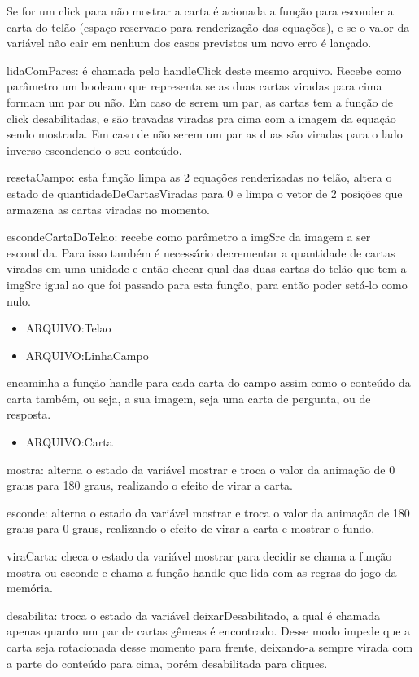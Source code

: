 Se for um click para não mostrar a carta é acionada a função para esconder a carta do telão (espaço reservado para renderização das equações), e se o valor da variável não cair em nenhum dos casos previstos um novo erro é lançado.

lidaComPares: é chamada pelo handleClick deste mesmo arquivo. Recebe como parâmetro um booleano que representa se as duas cartas viradas para cima formam um par ou não. Em caso de serem um par, as cartas tem a função de click desabilitadas, e são travadas viradas pra cima com a imagem da equação sendo mostrada. Em caso de não serem um par as duas são viradas para o lado inverso escondendo o seu conteúdo. 

resetaCampo: esta função limpa as 2 equações renderizadas no telão, altera o estado de quantidadeDeCartasViradas para 0 e limpa o vetor de 2 posições que armazena as cartas viradas no momento.

escondeCartaDoTelao: recebe como parâmetro a imgSrc da imagem a ser escondida. Para isso também é necessário decrementar a quantidade de cartas viradas em uma unidade e então checar qual das duas cartas do telão que tem a imgSrc igual ao que foi passado para esta função, para então poder setá-lo como nulo. 

\begin{itemize}
\item ARQUIVO:Telao
\end{itemize}	


\begin{itemize}
\item ARQUIVO:LinhaCampo
\end{itemize}

	encaminha a função handle para cada carta do campo assim como o conteúdo da carta também, ou seja, a sua imagem, seja uma carta de pergunta, ou de resposta.
 
\begin{itemize}
\item ARQUIVO:Carta
\end{itemize}
mostra: alterna o estado da variável mostrar e troca o valor da animação de 0 graus para 180 graus, realizando o efeito de virar a carta.

esconde: alterna o estado da variável mostrar e troca o valor da animação de 180 graus para 0 graus, realizando o efeito de virar a carta e mostrar o fundo.

viraCarta: checa o estado da variável mostrar para decidir se chama a função mostra ou esconde e chama a função handle que lida com as regras do jogo da memória.

desabilita: troca o estado da variável deixarDesabilitado, a qual é chamada apenas quanto um par de cartas gêmeas é encontrado. Desse modo impede que a carta seja rotacionada desse momento para frente, deixando-a sempre virada com a parte do conteúdo para cima, porém desabilitada para cliques.

